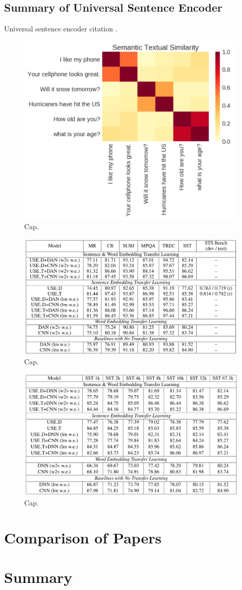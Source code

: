 \subsection{Summary of Universal Sentence Encoder}

Universal sentence encoder citation \cite{use}.

\begin{figure}
\centering
  \includegraphics[width=.5\linewidth]{files/use-1.png}
  \caption{Cap.}
  \label{fig:vae}
\end{figure}

\begin{figure}
\centering
  \includegraphics[width=.5\linewidth]{files/use-2.png}
  \caption{Cap.}
  \label{fig:vae}
\end{figure}

\begin{figure}
\centering
  \includegraphics[width=.5\linewidth]{files/use-3.png}
  \caption{Cap.}
  \label{fig:vae}
\end{figure}

\section{\label{sec:level5} Comparison of Papers}

\section{\label{sec:level6} Summary}
